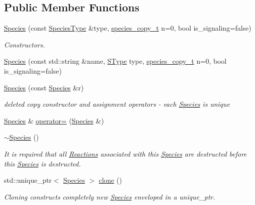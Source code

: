 \subsection*{Public Member Functions}
\begin{DoxyCompactItemize}
\item 
\hyperlink{group__Chemistry_ga90b2a3cd0053605f7e10ab707f2d63b7}{Species} (const \hyperlink{classSpeciesType}{Species\-Type} \&type, \hyperlink{common_8h_a3503f321fd36304ee274141275cca586}{species\-\_\-copy\-\_\-t} n=0, bool is\-\_\-signaling=false)
\begin{DoxyCompactList}\small\item\em Constructors. \end{DoxyCompactList}\item 
\hyperlink{group__Chemistry_gab6591cea94153ebb39f299ecb9080a40}{Species} (const std\-::string \&name, \hyperlink{group__Chemistry_ga49104ff0a7d4118feb179c2f1c906f12}{S\-Type} type, \hyperlink{common_8h_a3503f321fd36304ee274141275cca586}{species\-\_\-copy\-\_\-t} n=0, bool is\-\_\-signaling=false)
\item 
\hyperlink{group__Chemistry_gacbe63ed697b577739bbb6e7e49cd9d3f}{Species} (const \hyperlink{classSpecies}{Species} \&r)
\begin{DoxyCompactList}\small\item\em deleted copy constructor and assignment operators -\/ each \hyperlink{classSpecies}{Species} is unique \end{DoxyCompactList}\item 
\hyperlink{classSpecies}{Species} \& \hyperlink{group__Chemistry_ga0062677c88109f86560f27809fc7b37f}{operator=} (\hyperlink{classSpecies}{Species} \&)
\item 
\hyperlink{group__Chemistry_gaf36f93648e2dedc2f05b6fb0c067f35e}{$\sim$\-Species} ()
\begin{DoxyCompactList}\small\item\em It is required that all \hyperlink{classReaction}{Reactions} associated with this \hyperlink{classSpecies}{Species} are destructed before this \hyperlink{classSpecies}{Species} is destructed. \end{DoxyCompactList}\item 
std\-::unique\-\_\-ptr$<$ \hyperlink{classSpecies}{Species} $>$ \hyperlink{group__Chemistry_ga0a73815a85af18ccd2235a53789bc77c}{clone} ()
\begin{DoxyCompactList}\small\item\em Cloning constructs completely new \hyperlink{classSpecies}{Species} enveloped in a unique\-\_\-ptr. \end{DoxyCompactList}\item 

\end{DoxyCompactItemize}
